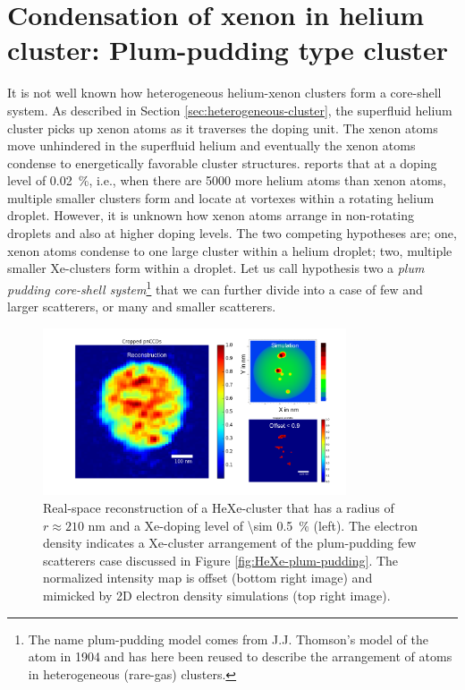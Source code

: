\section{Condensation of xenon in helium cluster: Plum-pudding type cluster}\label{sec:helium-data}
It is not well known how heterogeneous helium-xenon clusters form a core-shell system. As described in Section \ref{sec:heterogeneous-cluster}, the superfluid helium cluster picks up xenon atoms as it traverses the doping unit. The xenon atoms move unhindered in the superfluid helium and eventually the xenon atoms condense to energetically favorable cluster structures. \citep{Gomez-2014-Science} reports that at a doping level of \SI{0.02}{\percent}, i.e., when there are 5000 more helium atoms than xenon atoms, multiple smaller clusters form and locate at vortexes within a rotating helium droplet. However, it is unknown how xenon atoms arrange in non-rotating droplets and also at higher doping levels. The two competing hypotheses are; one, xenon atoms condense to one large cluster within a helium droplet; two, multiple smaller Xe-clusters form within a droplet. Let us call hypothesis two a \textit{plum pudding core-shell system}\footnote{The name plum-pudding model comes from J.J. Thomson's model of the atom in 1904 and has here been reused to describe the arrangement of atoms in heterogeneous (rare-gas) clusters.} that we can further divide into a case of few and larger scatterers, or many and smaller scatterers.\\[1\baselineskip]
\begin{figure}
 	\centering
 		\includegraphics[width=0.80\textwidth]{images/results/reconstructions-to-simulations.png}
 	\caption[Reconstruction of HeXe-clusters and simulated electron densities.]{Real-space reconstruction of a HeXe-cluster that has a radius of $r\approx 210$ nm and a Xe-doping level of \SI{\sim 0.5}{\percent} (left). The electron density indicates a Xe-cluster arrangement of the plum-pudding few scatterers case discussed in Figure \ref{fig:HeXe-plum-pudding}. The normalized intensity map is offset (bottom right image) and mimicked by 2D electron density simulations (top right image).}
 	\label{fig:HeXe-cluster-60}
\end{figure}
